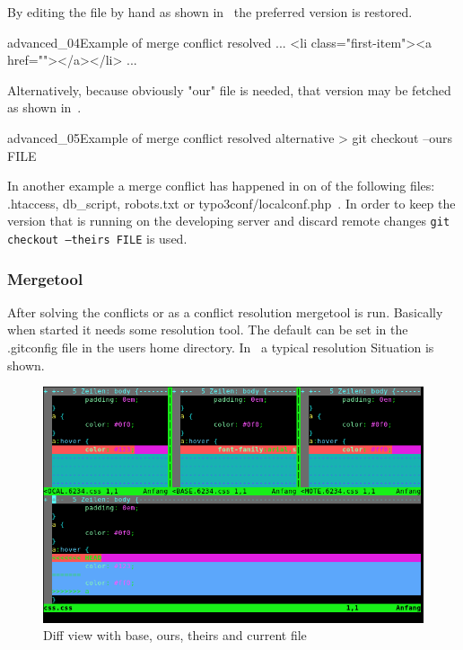 By editing the file by hand as shown in~ the preferred version is restored.
\begin{codelisting}{advanced_04}{Example of merge conflict resolved}
...
    <li class="first-item"><a href=""></a></li>
...
\end{codelisting}
Alternatively, because obviously "our" file is needed, that version may be fetched as shown in~.
\begin{codelisting}{advanced_05}{Example of merge conflict resolved alternative}
> git checkout --ours FILE
\end{codelisting}
In another example a merge conflict has happened in on of the following files: .htaccess, db\_script, robots.txt or typo3conf/localconf.php~. In order to keep the version that is running on the developing server and discard remote changes \texttt{git checkout --theirs FILE} is used.
\subsubsection{Mergetool}
After solving the conflicts or as a conflict resolution mergetool is run. Basically when started it needs some resolution tool. The default can be set in the .gitconfig file in the users home directory. In~ a typical resolution Situation is shown.
\label{fig:diff_view00}
\begin{figure}[htbp]
  \centering
  \includegraphics[width=\textwidth]{vimdiff_mergetool_00.png}
  \caption{Diff view with base, ours, theirs and current file}
\end{figure}

